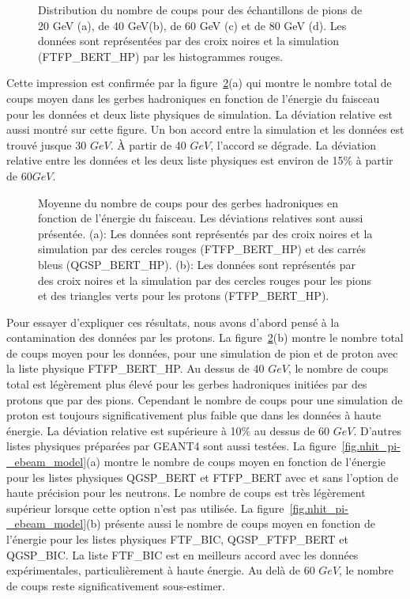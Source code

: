 \begin{figure}[!ht]
  \caption{Distribution du nombre de coups pour des échantillons de pions de 20 GeV (a), de 40 GeV(b), de 60 GeV (c) et de 80 GeV (d). Les données sont représentées par des croix noires et la simulation (FTFP\_BERT\_HP) par les histogrammes rouges. \label{fig.pi-nhit}}
\end{figure}
Cette impression est confirmée par la figure~\ref{fig.nhit_pi-_ebeam}(a) qui montre le nombre total de coups moyen dans les gerbes hadroniques en fonction de l'énergie du faisceau pour les données et deux liste physiques de simulation. La déviation relative est aussi montré sur cette figure. Un bon accord entre la simulation et les données est trouvé jusque 30 $GeV$. À partir de 40 $GeV$, l'accord se dégrade. La déviation relative entre les données et les deux liste physiques est environ de 15$\%$ à partir de 60$GeV$.
\begin{figure}[!ht]
  \caption{Moyenne du nombre de coups pour des gerbes hadroniques en fonction de l'énergie du faisceau. Les déviations relatives sont aussi présentée. (a): Les données sont représentés par des croix noires et la simulation par des cercles rouges (FTFP\_BERT\_HP) et des carrés bleus (QGSP\_BERT\_HP). (b): Les données sont représentés par des croix noires et la simulation par des cercles rouges pour les pions et des triangles verts pour les protons (FTFP\_BERT\_HP).}
  \label{fig.nhit_pi-_ebeam}
\end{figure}
Pour essayer d'expliquer ces résultats, nous avons d'abord pensé à la contamination des données par les protons. La figure~\ref{fig.nhit_pi-_ebeam}(b) montre le nombre total de coups moyen pour les données, pour une simulation de pion et de proton avec la liste physique FTFP\_BERT\_HP. Au dessus de 40 $GeV$, le nombre de coups total est légèrement plus élevé pour les gerbes hadroniques initiées par des protons que par des pions. Cependant le nombre de coups pour une simulation de proton est toujours significativement plus faible que dans les données à haute énergie. La déviation relative est supérieure à 10$\%$ au dessus de 60 $GeV$. D'autres listes physiques préparées par GEANT4 sont aussi testées. La figure~\ref{fig.nhit_pi-_ebeam_model}(a) montre le nombre de coups moyen en fonction de l'énergie pour les listes physiques QGSP\_BERT et FTFP\_BERT avec et sans l'option de haute précision pour les neutrons. Le nombre de coups est très légèrement supérieur lorsque cette option n'est pas utilisée. La figure~\ref{fig.nhit_pi-_ebeam_model}(b) présente aussi le nombre de coups moyen en fonction de l'énergie pour les listes physiques FTF\_BIC, QGSP\_FTFP\_BERT et QGSP\_BIC. La liste FTF\_BIC est en meilleurs accord avec les données expérimentales, particulièrement à haute énergie. Au delà de 60 $GeV$, le nombre de coups reste significativement sous-estimer.
